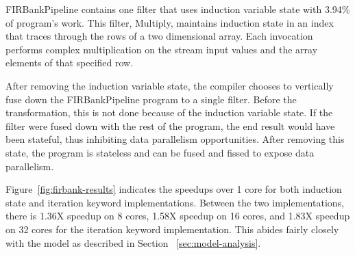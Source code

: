 FIRBankPipeline contains one filter that uses induction variable state with 3.94\% of program's work.  This filter, Multiply, maintains induction state in an index that traces through the rows of a two dimensional array.  Each invocation performs complex multiplication on the stream input values and the array elements of that specified row.  

After removing the induction variable state, the compiler chooses to vertically fuse down the FIRBankPipeline program to a single filter.  Before the transformation, this is not done because of the induction variable state.  If the filter were fused down with the rest of the program, the end result would have been stateful, thus inhibiting data parallelism opportunities.  After removing this state, the program is stateless and can be fused and fissed to expose data parallelism.


Figure~\ref{fig:firbank-results} indicates the speedups over 1 core for both induction state and iteration keyword implementations.  Between the two implementations, there is 1.36X speedup on 8 cores, 1.58X speedup on 16 cores, and 1.83X speedup on 32 cores for the iteration keyword implementation.  This abides fairly closely with the model as described in Section ~\ref{sec:model-analysis}.  